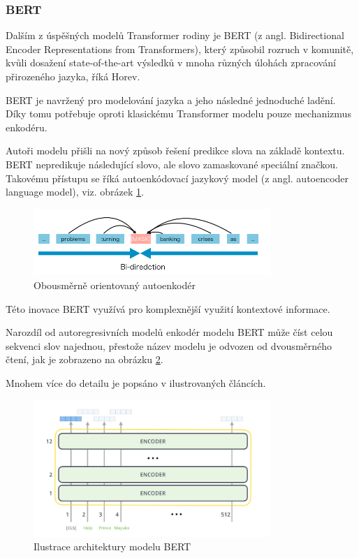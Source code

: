 \documentclass[thesis=M,czech]{FITthesis}[2019/12/23]
\begin{document}
\newpage
\subsubsection*{BERT}
Dalším z úspěšných modelů Transformer rodiny je BERT (z angl. Bidirectional Encoder Representations from Transformers)\cite{devlin2018}, který způsobil rozruch v komunitě, kvůli dosažení state-of-the-art výsledků v mnoha různých úlohách zpracování přirozeného jazyka, říká Horev\cite{horev2018}.

BERT je navržený pro modelování jazyka a jeho následné jednoduché ladění. Díky tomu potřebuje oproti klasickému Transformer modelu pouze mechanizmus enkodéru.

Autoři modelu přišli na nový způsob řešení predikce slova na základě kontextu. BERT nepredikuje následující slovo, ale slovo zamaskované speciální značkou. Takovému přístupu se říká autoenkódovací jazykový model (z angl. autoencoder language model), viz. obrázek \ref{fig:liang2019BERT}.
\begin{figure}\centering
	\includegraphics[width=0.8\textwidth]{images/liang2019/liang2019_BERT.png}
	\caption{Obousměrně orientovaný autoenkodér\cite{liang2019}}\label{fig:liang2019BERT}
\end{figure}
Této inovace BERT využívá pro komplexnější využití kontextové informace.

Narozdíl od autoregresivních modelů enkodér modelu BERT může číst celou sekvenci slov najednou, přestože název modelu je odvozen od dvousměrného čtení, jak je zobrazeno na obrázku \ref{fig:alammar2018BERT}.

Mnohem více do detailu je popsáno v ilustrovaných článcích\cite{alammar2018}\cite{alammar2018b}.
\begin{figure}\centering
	\includegraphics[width=0.8\textwidth]{images/alammar2018_BERT.png}
	\caption{Ilustrace architektury modelu BERT\cite{alammar2018}}\label{fig:alammar2018BERT}
\end{figure}
\end{document}
